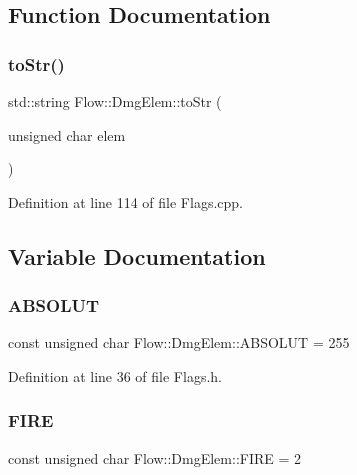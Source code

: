 \subsection{Function Documentation}
\hypertarget{namespace_flow_1_1_dmg_elem_a80b9d857d3c347b4d04d852602ee0060}{}\label{namespace_flow_1_1_dmg_elem_a80b9d857d3c347b4d04d852602ee0060} 
\subsubsection{\texorpdfstring{to\+Str()}{toStr()}}
{\footnotesize\ttfamily std\+::string Flow\+::\+Dmg\+Elem\+::to\+Str (\begin{DoxyParamCaption}\item[{unsigned char}]{elem }\end{DoxyParamCaption})}



Definition at line 114 of file Flags.\+cpp.



\subsection{Variable Documentation}
\hypertarget{namespace_flow_1_1_dmg_elem_a91b40559f8ea36309d1459ae990e7737}{}\label{namespace_flow_1_1_dmg_elem_a91b40559f8ea36309d1459ae990e7737} 
\subsubsection{\texorpdfstring{A\+B\+S\+O\+L\+UT}{ABSOLUT}}
{\footnotesize\ttfamily const unsigned char Flow\+::\+Dmg\+Elem\+::\+A\+B\+S\+O\+L\+UT = 255}



Definition at line 36 of file Flags.\+h.

\hypertarget{namespace_flow_1_1_dmg_elem_aa25b22e8ba30a8c765912ceda3110cab}{}\label{namespace_flow_1_1_dmg_elem_aa25b22e8ba30a8c765912ceda3110cab} 
\subsubsection{\texorpdfstring{F\+I\+RE}{FIRE}}
{\footnotesize\ttfamily const unsigned char Flow\+::\+Dmg\+Elem\+::\+F\+I\+RE = 2}



